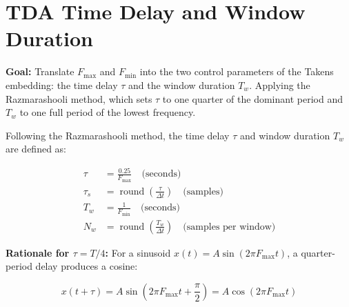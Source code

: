 \documentclass{article}
\begin{document}
%	
%	
%	
	
	\section{TDA Time Delay and Window Duration}
	
	\textbf{Goal:} Translate $F_{\max}$ and $F_{\min}$ into
	the two control parameters of the Takens embedding:
	the time delay $\tau$ and the window duration $T_w$.
	Applying the Razmarashooli method, which sets
	$\tau$ to one quarter of the dominant period and $T_w$
	to one full period of the lowest frequency.
	
	Following the Razmarashooli method, the time delay $\tau$ and
	window duration $T_w$ are defined as:
	
	\begin{align}
		\tau      &= \frac{0.25}{F_{\max}} \quad \text{(seconds)}
		\label{eq:tau} \\[4pt]
		\tau_s    &= \operatorname{round}\!\left(\frac{\tau}{\Delta t}\right)
		\quad \text{(samples)} \\[8pt]
		T_w       &= \frac{1}{F_{\min}} \quad \text{(seconds)}
		\label{eq:Tw} \\[4pt]
		N_w       &= \operatorname{round}\!\left(\frac{T_w}{\Delta t}\right)
		\quad \text{(samples per window)}
	\end{align}
	
	\textbf{Rationale for $\tau = T/4$:}
	For a sinusoid $x(t) = A\sin(2\pi F_{\max} t)$, a
	quarter-period delay produces a cosine:
	
	\begin{equation}
		x(t + \tau) = A\sin\!\left(2\pi F_{\max} t + \frac{\pi}{2}\right)
		= A\cos(2\pi F_{\max} t)
	\end{equation}
	
\end{document}
